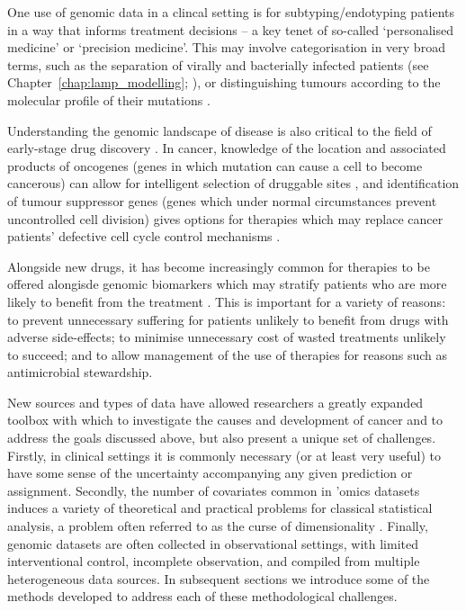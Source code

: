 \documentclass[thesis.tex]{subfiles}
\begin{document}
One use of genomic data in a clincal setting is for subtyping/endotyping patients in a way that informs treatment decisions -- a key tenet of so-called `personalised medicine' or `precision medicine'. This may involve categorisation in very broad terms, such as the separation of virally and bacterially infected patients (see Chapter~\ref{chap:lamp_modelling}; \citealp{remmel_diagnostic_2022}), or distinguishing tumours according to the molecular profile of their mutations \citep{zhao_molecular_2019}.

Understanding the genomic landscape of disease is also critical to the field of early-stage drug discovery \citep{nelson_support_2015, raja_integrating_2017, king_are_2019}. In cancer, knowledge of the location and associated products of oncogenes (genes in which mutation can cause a cell to become cancerous) can allow for intelligent selection of druggable sites \citep{weinstein_cancer_2002, bedard_small_2020}, and identification of tumour suppressor genes (genes which under normal circumstances prevent uncontrolled cell division) gives options for therapies which may replace cancer patients' defective cell cycle control mechanisms \citep{fang_tumor-suppressing_2003, morris_therapeutic_2015}. 

Alongside new drugs, it has become increasingly common for therapies to be offered alongisde genomic biomarkers which may stratify patients who are more likely to benefit from the treatment \citep{weber_egfr_2014, awad_precision_2019, zhu_association_2019, safarika_29-mrna_2021}. This is important for a variety of reasons: to prevent unnecessary suffering for patients unlikely to benefit from drugs with adverse side-effects; to minimise unnecessary cost of wasted treatments unlikely to succeed; and to allow management of the use of therapies for reasons such as antimicrobial stewardship.

New sources and types of data have allowed researchers a greatly expanded
toolbox with which to investigate the causes and development of cancer and to address the goals discussed above, but
also present a unique set of challenges. Firstly, in clinical settings it is commonly necessary (or at least very useful) to have some sense of the uncertainty accompanying any given prediction or assignment. Secondly, the number of covariates common in ’omics datasets induces a variety of theoretical and practical problems for classical statistical analysis, a problem often referred to as the curse of dimensionality \citep{barbour_precision_2019, buhlmann_high-dimensional_2014}. Finally, genomic datasets are often collected in observational settings, with limited interventional control, incomplete observation, and compiled from multiple heterogeneous data sources. In subsequent sections we introduce some of the methods developed to address each of these methodological challenges.
\end{document}
